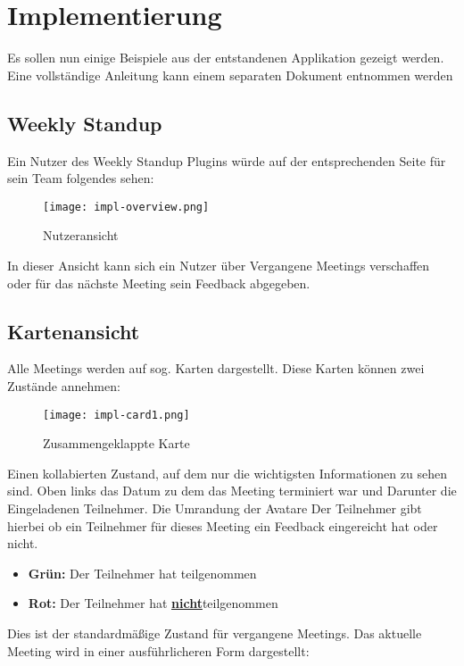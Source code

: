 \chapter{Implementierung}

Es sollen nun einige Beispiele aus der entstandenen Applikation gezeigt werden. Eine vollständige Anleitung kann einem separaten Dokument entnommen werden

\section{Weekly Standup}

Ein  Nutzer des Weekly Standup Plugins würde auf der entsprechenden Seite für sein Team folgendes sehen:

\begin{figure}[H]
	\centering
	\texttt{[image: impl-overview.png]}
    \caption{Nutzeransicht}
	\label{fig:userview}
\end{figure}

In dieser Ansicht kann sich ein Nutzer über Vergangene Meetings verschaffen oder für das nächste Meeting sein Feedback abgegeben.

\section{Kartenansicht}

Alle Meetings werden auf sog. Karten dargestellt. Diese Karten können zwei Zustände annehmen: 
\begin{figure}[H]
	\centering
	\texttt{[image: impl-card1.png]}
    \caption{Zusammengeklappte Karte}
	\label{fig:collapsedCard}
\end{figure}

Einen kollabierten Zustand, auf dem nur die wichtigsten Informationen zu sehen sind. Oben links das Datum zu dem das Meeting terminiert war und Darunter die Eingeladenen Teilnehmer.
Die Umrandung der Avatare Der Teilnehmer gibt hierbei ob ein Teilnehmer für dieses Meeting ein Feedback eingereicht hat oder nicht. 
\begin{itemize}
\item \textbf{Grün:} Der Teilnehmer hat teilgenommen
\item \textbf{Rot:} Der Teilnehmer hat \textbf{\underline{nicht}}teilgenommen
\end{itemize}
Dies ist der standardmäßige Zustand für vergangene Meetings. Das aktuelle Meeting wird in einer ausführlicheren Form dargestellt:

